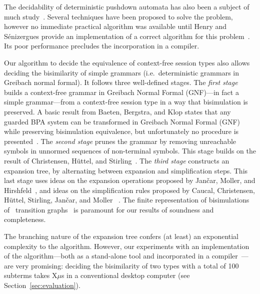 
The decidability of deterministic pushdown automata has
also been a subject of much
study~\cite{janvcar2008selected,senizergues1997equivalence,stirling2001decidability}.
Several techniques have been proposed to solve the problem, however no
immediate practical algorithm was available until Henry and
S{\'e}nizergues provide an implementation of a correct algorithm for
this problem~\cite{henry2013lalblc}. Its poor performance precludes
the incorporation in a compiler.

Our algorithm to decide the equivalence of context-free session types
also allows deciding the bisimilarity of simple grammars
(i.e.\ deterministic grammars in Greibach normal formal).  It follows
three well-defined stages.
%
The \emph{first stage} builds a context-free grammar in Greibach
Normal Formal (GNF)---in fact a simple grammar---from a context-free
session type in a way that bisimulation is preserved.  A basic result
from Baeten, Bergstra, and Klop states that any guarded BPA system can
be transformed in Greibach Normal Formal (GNF) while preserving
bisimulation equivalence, but unfortunately no procedure is
presented~\cite{baeten1993decidability}.
%
The \emph{second stage} prunes the grammar by removing unreachable
symbols in unnormed sequences of non-terminal symbols. This stage
builds on the result of Christensen, H\"uttel, and 
Stirling~\cite{DBLP:journals/iandc/ChristensenHS95}.
%
The \emph{third stage} constructs an expansion tree, by alternating
between expansion and simplification steps.  This last stage uses
ideas on the expansion operations proposed by Jan\v car, Moller, and
Hirshfeld~\cite{hirshfeld1996bisimulation,janvcar1999techniques}, and
ideas on the simplification rules proposed by Caucal, Christensen,
H\"uttel, Stirling, Jan\v car, and Moller
~\cite{caucal1986decidabilite,DBLP:journals/iandc/ChristensenHS95,janvcar1999techniques}.
The finite representation of bisimulations of \BPA\ transition
graphs~\cite{caucal1986decidabilite,DBLP:journals/iandc/ChristensenHS95}
is paramount for our results of soundness and completeness.


The branching nature of the expansion tree confers (at least) an
exponential complexity to the algorithm.
%
However, our experiments with an implementation of the
algorithm---both as a stand-alone tool and incorporated in a
compiler~\cite{almeida.etal_freest-functional-language}---are very
promising: deciding the bisimilarity of two types with a total of 100
subterms takes X$\mu$s in a conventional desktop computer (see
Section~\ref{sec:evaluation}).


